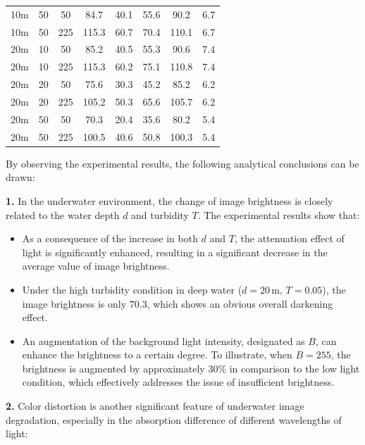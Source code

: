 \documentclass[withoutpreface,bwprint]{cumcmthesis}
\begin{document}
\begin{table}[!ht]
\begin{tabular}{cccccccc}
        10m & 50 & 50 & 84.7 & 40.1 & 55.6  & 90.2  & 6.7  \\ 
        10m & 50 & 225 & 115.3 & 60.7 & 70.4  & 110.1  & 6.7  \\ 
        20m & 10 & 50 & 85.2 & 40.5 & 55.3  & 90.6  & 7.4  \\ 
        20m & 10 & 225 & 115.3 & 60.2 & 75.1 & 110.8  & 7.4  \\ 
        20m & 20 & 50 & 75.6 & 30.3 & 45.2  & 85.2  & 6.2  \\ 
        20m & 20 & 225 & 105.2 & 50.3 & 65.6  & 105.7 & 6.2  \\ 
        20m & 50 & 50 & 70.3 & 20.4 & 35.6  & 80.2  & 5.4  \\ 
        20m & 50 & 225 & 100.5 & 40.6 & 50.8  & 100.3  & 5.4  \\ 
        \bottomrule
    \end{tabular}
\end{table}



By observing the experimental results, the following analytical conclusions can be drawn:

\textbf{1.} In the underwater environment, the change of image brightness is closely related to the water depth $d$ and turbidity $T$. The experimental results show that:

\begin{itemize}[itemindent=2em]
    \item As a consequence of the increase in both $d$ and $T$, the attenuation effect of light is significantly enhanced, resulting in a significant decrease in the average value of image brightness.

    \item Under the high turbidity condition in deep water ($d = 20 \, \text{m}, \, T = 0.05$), the image brightness is only $70.3$, which shows an obvious overall darkening effect.

    \item An augmentation of the background light intensity, designated as $B$, can enhance the brightness to a certain degree. To illustrate, when $B = 255$, the brightness is augmented by approximately $30\%$ in comparison to the low light condition, which effectively addresses the issue of insufficient brightness.
\end{itemize}

\textbf{2.} Color distortion is another significant feature of underwater image degradation, especially in the absorption difference of different wavelengths of light:
\end{document}
